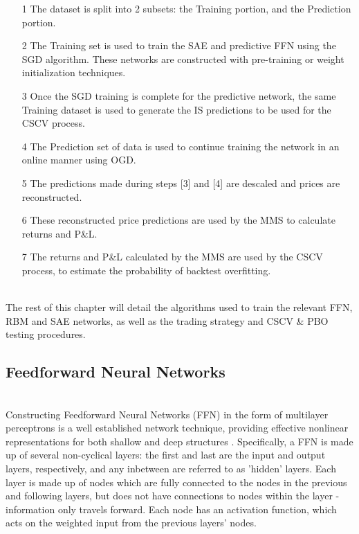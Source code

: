 \documentclass[a4paper,11pt,oneside]{article}
\theoremstyle{plain}
\theoremstyle{definition}
\begin{document}
\begin{itemize}
	\item [1] The dataset is split into 2 subsets: the Training portion, and the Prediction portion.
	\item [2] The Training set is used to train the SAE and predictive FFN using the SGD algorithm. These networks are constructed with pre-training or weight initialization techniques.
	\item [3] Once the SGD training is complete for the predictive network, the same Training dataset is used to generate the IS predictions to be used for the CSCV process.
	\item [4] The Prediction set of data is used to continue training the network in an online manner using OGD.
	\item [5] The predictions made during steps [3] and [4] are descaled and prices are reconstructed.
	\item [6] These reconstructed price predictions are used by the MMS to calculate returns and P\&L.
	\item [7] The returns and P\&L calculated by the MMS are used by the CSCV process, to estimate the probability of backtest overfitting.
\end{itemize}
~\\
The rest of this chapter will detail the algorithms used to train the relevant FFN, RBM and SAE networks, as well as the trading strategy and CSCV \& PBO testing procedures.

\subsection{Feedforward Neural Networks}\label{imp_ffn}
~\\
Constructing Feedforward Neural Networks (FFN) in the form of multilayer perceptrons is a well established network technique, providing effective nonlinear representations for both shallow and deep structures \cite{Schmidhuber}. Specifically, a FFN is made up of several non-cyclical layers: the first and last are the input and output layers, respectively, and any inbetween are referred to as 'hidden' layers. Each layer is made up of nodes which are fully connected to the nodes in the previous and following layers, but does not have connections to nodes within the layer - information only travels forward. Each 
node has an activation function, which acts on the weighted input from the previous layers' nodes.
\end{document}
